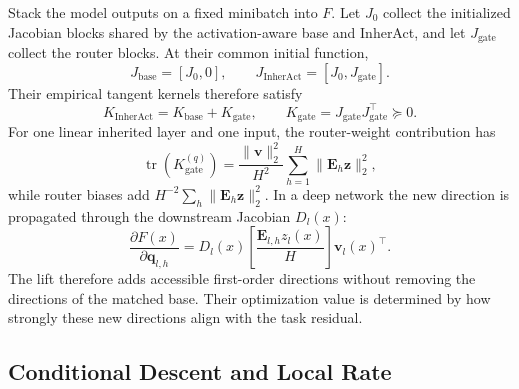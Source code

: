 \documentclass{article}
\DeclareMathOperator{\tr}{tr}
\newcommand{\bE}{\mathbf{E}}
\begin{document}
Stack the model outputs on a fixed minibatch into $F$.  Let $J_0$ collect the
initialized Jacobian blocks shared by the activation-aware base and InherAct,
and let $J_{\mathrm{gate}}$ collect the router blocks.  At their common initial
function,
\begin{equation}
  J_{\mathrm{base}}=[J_0,0],\qquad
  J_{\mathrm{InherAct}}=[J_0,J_{\mathrm{gate}}].
\end{equation}
Their empirical tangent kernels therefore satisfy
\begin{equation}
  K_{\mathrm{InherAct}}
  =K_{\mathrm{base}}+K_{\mathrm{gate}},\qquad
  K_{\mathrm{gate}}=J_{\mathrm{gate}}J_{\mathrm{gate}}^\top\succeq0.
  \label{eq:psd-tangent-addition}
\end{equation}
For one linear inherited layer and one input, the router-weight contribution has
\begin{equation}
  \tr(K_{\mathrm{gate}}^{(q)})
  =\frac{\|\mathbf{v}\|_2^2}{H^2}
   \sum_{h=1}^H\|\bE_h\mathbf{z}\|_2^2,
  \label{eq:router-tangent-energy}
\end{equation}
while router biases add
$H^{-2}\sum_h\|\bE_h\mathbf{z}\|_2^2$.  In a deep network the new direction is
propagated through the downstream Jacobian $D_l(x)$:
\begin{equation}
  \frac{\partial F(x)}{\partial\mathbf{q}_{l,h}}
  =D_l(x)\left[\frac{\bE_{l,h}z_l(x)}{H}\right]\mathbf{v}_l(x)^\top.
\end{equation}
The lift therefore adds accessible first-order directions without removing the
directions of the matched base.  Their optimization value is determined by how
strongly these new directions align with the task residual.

\subsection{Conditional Descent and Local Rate}
\end{document}
